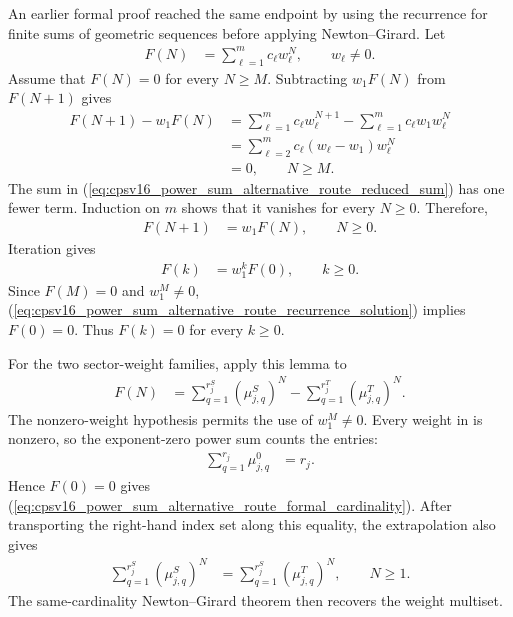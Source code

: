\documentclass{article}
\begin{document}
An earlier formal proof reached the same endpoint by using the recurrence for
finite sums of geometric sequences before applying Newton--Girard. Let
\begin{align}
    F(N)
        &=\sum_{\ell=1}^{m}c_\ell w_\ell^N,
        \qquad w_\ell\neq 0.
    \label{eq:cpsv16_power_sum_alternative_route_geometric_sum}
\end{align}
Assume that $F(N)=0$ for every $N\geq M$. Subtracting $w_1F(N)$ from
$F(N+1)$ gives
\begin{align}
    F(N+1)-w_1F(N)
        &=\sum_{\ell=1}^{m}c_\ell w_\ell^{N+1}
          -\sum_{\ell=1}^{m}c_\ell w_1w_\ell^N
    \label{eq:cpsv16_power_sum_alternative_route_recurrence_expansion}\\
        &=\sum_{\ell=2}^{m}
          c_\ell(w_\ell-w_1)w_\ell^N
    \label{eq:cpsv16_power_sum_alternative_route_reduced_sum}\\
        &=0,
        \qquad N\geq M.
    \label{eq:cpsv16_power_sum_alternative_route_reduced_sum_eventual_zero}
\end{align}
The sum in
(\ref{eq:cpsv16_power_sum_alternative_route_reduced_sum}) has one fewer term.
Induction on $m$ shows that it vanishes for every $N\geq 0$. Therefore,
\begin{align}
    F(N+1)
        &=w_1F(N),
        \qquad N\geq 0.
    \label{eq:cpsv16_power_sum_alternative_route_global_recurrence}
\end{align}
Iteration gives
\begin{align}
    F(k)
        &=w_1^kF(0),
        \qquad k\geq 0.
    \label{eq:cpsv16_power_sum_alternative_route_recurrence_solution}
\end{align}
Since $F(M)=0$ and $w_1^M\neq 0$,
(\ref{eq:cpsv16_power_sum_alternative_route_recurrence_solution}) implies
$F(0)=0$. Thus $F(k)=0$ for every $k\geq 0$.

For the two sector-weight families, apply this lemma to
\begin{align}
    F(N)
        &=\sum_{q=1}^{r_j^S}(\mu^S_{j,q})^N
          -\sum_{q=1}^{r_j^T}(\mu^T_{j,q})^N.
    \label{eq:cpsv16_power_sum_alternative_route_signed_weight_sum}
\end{align}
The nonzero-weight hypothesis permits the use of $w_1^M\neq 0$. Every weight
in  is nonzero, so the exponent-zero power sum counts
the entries:
\begin{align}
    \sum_{q=1}^{r_j}\mu_{j,q}^{0}
        &=r_j.
    \label{eq:cpsv16_power_sum_alternative_route_zero_power_count}
\end{align}
Hence $F(0)=0$ gives
(\ref{eq:cpsv16_power_sum_alternative_route_formal_cardinality}). After
transporting the right-hand index set along this equality, the extrapolation
also gives
\begin{align}
    \sum_{q=1}^{r_j^S}(\mu^S_{j,q})^N
        &=\sum_{q=1}^{r_j^S}(\mu^T_{j,q})^N,
        \qquad N\geq 1.
    \label{eq:cpsv16_power_sum_alternative_route_common_index_power_sums}
\end{align}
The same-cardinality Newton--Girard theorem then recovers the weight multiset.
\end{document}

